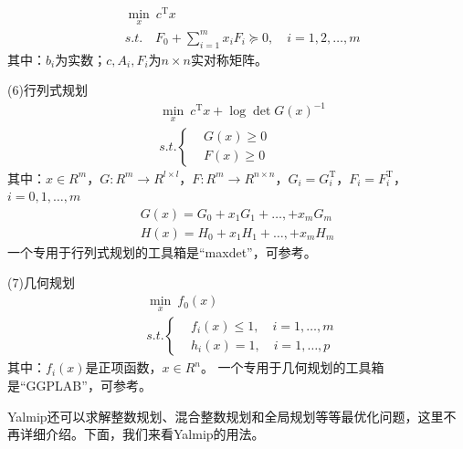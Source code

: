         \begin{align*}
        &\min_x \ c^\mathrm{T}x\\
        &s.t. \quad F_0 + \sum_{i = 1}^mx_iF_i \succeq 0,\quad i = 1,2,\dots,m
        \end{align*}
        其中：$b_i$为实数；$c,A_i,F_i$为$n\times n$实对称矩阵。
        \par
        (6)行列式规划
       \begin{align*}
        &\min_x \ c ^\mathrm{T} x + \log \det G(x)^{-1}\\
        &s.t.\left\{
        \begin{aligned}
        &G(x) \geqslant 0\\
        &F(x) \geqslant 0
        \end{aligned}
        \right.
        \end{align*}
        其中：$x\in R^m$，$G:R^m \rightarrow R^{l\times l}$，$F:R^m\rightarrow R^{n\times n}$，$G_i = G_i^\mathrm{T}$，$F_i = F_i^\mathrm{T}$，$i = 0,1,\dots,m$
        \begin{align*}
        G(x) = G_0 + x_1G_1 + \dots,+x_mG_m\\
        H(x) = H_0 + x_1H_1 + \dots,+x_mH_m
        \end{align*}
        一个专用于行列式规划的工具箱是“maxdet”，可参考\cite{Maxdetguide}。
        \par
        (7)几何规划
        \begin{align*}
        &\min_x \ f_0(x)\\
        &s.t.\left\{
        \begin{aligned}
        &f_i(x) \leqslant 1,\quad i = 1,\dots,m\\
        &h_i(x) = 1,\quad i = 1,\dots,p
        \end{aligned}
        \right.
        \end{align*}
        其中：$f_i(x)$是正项函数，$x\in R^n$。
        一个专用于几何规划的工具箱是“GGPLAB”，可参考\cite{GGPLAB}。
        \par
        Yalmip还可以求解整数规划、混合整数规划和全局规划等等最优化问题，这里不再详细介绍。下面，我们来看Yalmip的用法。
